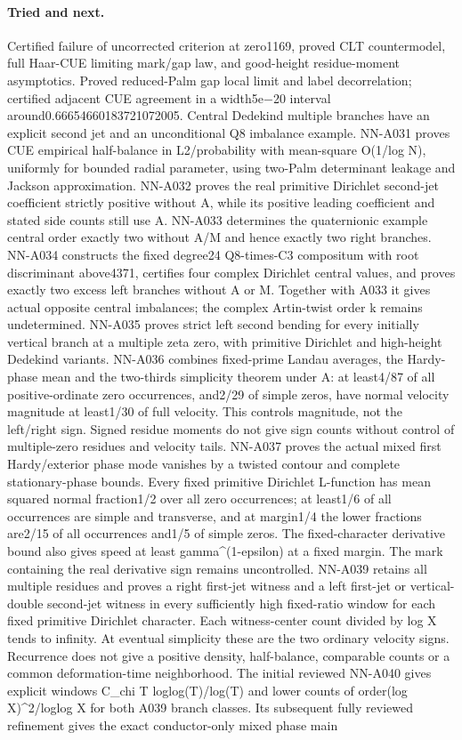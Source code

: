 \paragraph{Tried and next.} Certified failure of uncorrected criterion at zero1169, proved CLT countermodel, full Haar-CUE limiting mark/gap law, and good-height residue-moment asymptotics. Proved reduced-Palm gap local limit and label decorrelation; certified adjacent CUE agreement in a width5e−20 interval around0.66654660183721072005. Central Dedekind multiple branches have an explicit second jet and an unconditional Q8 imbalance example. NN-A031 proves CUE empirical half-balance in L2/probability with mean-square O(1/log N), uniformly for bounded radial parameter, using two-Palm determinant leakage and Jackson approximation. NN-A032 proves the real primitive Dirichlet second-jet coefficient strictly positive without A, while its positive leading coefficient and stated side counts still use A. NN-A033 determines the quaternionic example central order exactly two without A/M and hence exactly two right branches. NN-A034 constructs the fixed degree24 Q8-times-C3 compositum with root discriminant above4371, certifies four complex Dirichlet central values, and proves exactly two excess left branches without A or M. Together with A033 it gives actual opposite central imbalances; the complex Artin-twist order k remains undetermined. NN-A035 proves strict left second bending for every initially vertical branch at a multiple zeta zero, with primitive Dirichlet and high-height Dedekind variants. NN-A036 combines fixed-prime Landau averages, the Hardy-phase mean and the two-thirds simplicity theorem under A: at least4/87 of all positive-ordinate zero occurrences, and2/29 of simple zeros, have normal velocity magnitude at least1/30 of full velocity. This controls magnitude, not the left/right sign. Signed residue moments do not give sign counts without control of multiple-zero residues and velocity tails. NN-A037 proves the actual mixed first Hardy/exterior phase mode vanishes by a twisted contour and complete stationary-phase bounds. Every fixed primitive Dirichlet L-function has mean squared normal fraction1/2 over all zero occurrences; at least1/6 of all occurrences are simple and transverse, and at margin1/4 the lower fractions are2/15 of all occurrences and1/5 of simple zeros. The fixed-character derivative bound also gives speed at least gamma\textasciicircum{}(1-epsilon) at a fixed margin. The mark containing the real derivative sign remains uncontrolled. NN-A039 retains all multiple residues and proves a right first-jet witness and a left first-jet or vertical-double second-jet witness in every sufficiently high fixed-ratio window for each fixed primitive Dirichlet character. Each witness-center count divided by log X tends to infinity. At eventual simplicity these are the two ordinary velocity signs. Recurrence does not give a positive density, half-balance, comparable counts or a common deformation-time neighborhood. The initial reviewed NN-A040 gives explicit windows C\_chi T loglog(T)/log(T) and lower counts of order(log X)\textasciicircum{}2/loglog X for both A039 branch classes. Its subsequent fully reviewed refinement gives the exact conductor-only mixed phase main 